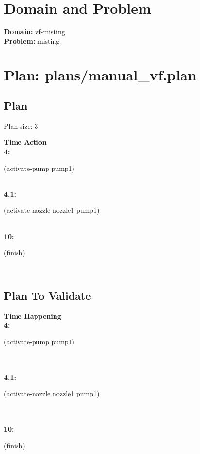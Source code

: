 \documentclass[a4paper,12pt]{article}
\author{\mbox{\sc {\sc Val}}}
\newcommand{\headingtimeaction}{{\bf Time} \qquad \= {\bf Action}\\[0.8ex]}
\newcommand{\headingtimehappening}{{\bf Time} \qquad \= {\bf Happening}\\[0.8ex]}
\newcommand{\atime}[1]{{\bf #1:}}
\newcommand{\action}[1]{{\sf #1}}
\newcommand{\listrow}[1]{\begin{minipage}[t]{11.5cm} #1 \end{minipage}}
\begin{document}
 \maketitle 
\section{Domain and Problem}
{\bf Domain:} vf-misting\\
{\bf Problem:} misting
\section{\sloppy Plan: plans/\-manual\_vf.plan}
\subsection{Plan}
Plan size: 3
\begin{tabbing}
\headingtimeaction 
\atime{4} \> \listrow{\action{(activate-pump pump1)}}\\
\atime{4.1} \> \listrow{\action{(activate-nozzle nozzle1 pump1)}}\\
\atime{10} \> \listrow{\action{(finish)}}\\
\end{tabbing}
\subsection{Plan To Validate}
\begin{tabbing}
\headingtimehappening 
\atime{4}  \> \listrow{\action{(activate-pump pump1)}}\\
\\\atime{4.1}  \> \listrow{\action{(activate-nozzle nozzle1 pump1)}}\\
\\\atime{10}  \> \listrow{\action{(finish)}}\\
\end{tabbing}
\end{document}
